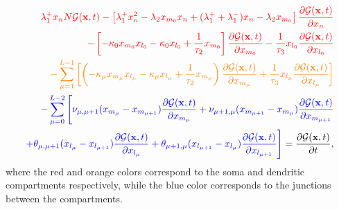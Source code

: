 \documentclass[a4paper, 11pt]{article}
\begin{document}
\begin{equation}
  \begin{split}
    \textcolor{red}{\lambda_1^+x_nN\mathcal G(\mathbf x, t)
    - \left[\lambda_1^+x_n^2 - \lambda_2x_{m_0}x_n + (\lambda_1^++\lambda_1^-)x_n-\lambda_2x_{m_0}\right]\frac{\partial\mathcal G(\mathbf x, t)}{\partial x_n}}\\
    \textcolor{red}{- \left[-\kappa_0x_{m_0}x_{l_0} - \kappa_0x_{l_0} + \frac{1}{\tau_2}x_{m_0}\right]\frac{\partial\mathcal G(\mathbf x, t)}{\partial x_{m_0}}
      -\frac{1}{\tau_3}x_{l_0}\frac{\partial\mathcal G(\mathbf x, t)}{\partial x_{l_0}}}\\
    \textcolor{orange}{-\sum_{\mu=1}^{L-1}\left[\left(-\kappa_{\mu}x_{m_{\mu}}x_{l_{\mu}} - \kappa_{\mu}x_{l_{\mu}} + \frac{1}{\tau_2}x_{m_{\mu}}\right)\frac{\partial \mathcal G(\mathbf x, t)}{\partial x_{m_{\mu}}} + \frac{1}{\tau_3}x_{l_{\mu}}\frac{\partial\mathcal G(\mathbf x, t)}{\partial x_{l_{\mu}}}\right]}\\
    \textcolor{blue}{-\sum_{\mu=0}^{L-2}\Bigg[\nu_{\mu,\mu+1}(x_{m_\mu}-x_{m_{\mu+1}})\frac{\partial\mathcal G(\mathbf x, t)}{\partial x_{m_\mu}} + \nu_{\mu+1,\mu}(x_{m_{\mu+1}}-x_{m_\mu})\frac{\partial\mathcal G(\mathbf x, t)}{\partial x_{m_{\mu+1}}} } \\
      \textcolor{blue}{+\theta_{\mu,\mu+1}(x_{l_\mu}-x_{l_{\mu+1}})\frac{\partial\mathcal G(\mathbf x, t)}{\partial x_{l_\mu}} + \theta_{\mu+1,\mu}(x_{l_{\mu+1}}-x_{l_\mu})\frac{\partial\mathcal G(\mathbf x, t)}{\partial x_{l_{\mu+1}}}\Bigg]}=\frac{\partial\mathcal G(\mathbf x, t)}{\partial t},
  \end{split}
\end{equation}
where the red and orange colors correspond to the soma and dendritic compartments respectively, while the blue color corresponds to the junctions between the compartments.

\end{document}
